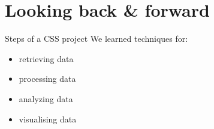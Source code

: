\documentclass[handout]{beamer}
\begin{document}
\section{Looking back \& forward}




\begin{frame}{Steps of a CSS project}
We learned techniques for:
\begin{itemize}
	\item retrieving data
	\item processing data
	\item analyzing data
	\item visualising data
\end{itemize}

\end{frame}
\end{document}
